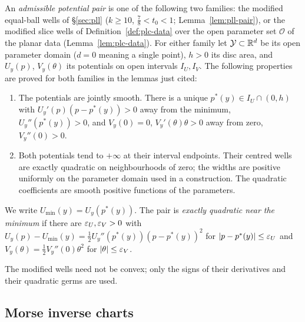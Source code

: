 \begin{definition}\label{def:pln-potential-pair}
An \emph{admissible potential pair} is one of the following two families: the modified equal-ball wells of
\S\ref{sec:pll} ($k\ge10$, $\frac78<t_0<1$; Lemma~\ref{lem:pll-pair}), or the modified slice wells of
Definition~\ref{def:plc-data} over the open parameter set $\mathcal O$ of the planar data (Lemma~\ref{lem:plc-data}).
For either family let $\mathcal Y\subset\mathbb{R}^d$ be its open parameter domain ($d=0$ meaning a single point), $h>0$ its
disc area, and $U_y(p)$, $V_y(\theta)$ its potentials on open intervals $I_U,I_V$. The following properties are proved
for both families in the lemmas just cited:
\begin{enumerate}[label=(P\arabic*)]
\item\label{it:pln-P1} The potentials are jointly smooth. There is a unique
$p^*(y)\in I_U\cap(0,h)$ with $U_y'(p)(p-p^*(y))>0$ away from the minimum,
$U_y''(p^*(y))>0$, and $V_y(0)=0$, $V_y'(\theta)\theta>0$ away from zero,
$V_y''(0)>0$.
\item\label{it:pln-P2} Both potentials tend to $+\infty$ at their interval
endpoints. Their centred wells are exactly quadratic on neighbourhoods of zero;
the widths are positive uniformly on the parameter domain used in a construction.
The quadratic coefficients are smooth positive functions of the parameters.
\end{enumerate}
We write $U_{\min}(y)=U_y(p^*(y))$. The pair is \emph{exactly quadratic near the minimum} if there are
$\varepsilon_U,\varepsilon_V>0$ with $U_y(p)-U_{\min}(y)=\frac12U_y''(p^*(y))(p-p^*(y))^2$ for $|p-p^*(y)|\le\varepsilon_U$ and
$V_y(\theta)=\frac12V_y''(0)\theta^2$ for $|\theta|\le\varepsilon_V$.
\end{definition}

The modified wells need not be convex; only the signs of their derivatives and their quadratic germs are used.

\subsection{Morse inverse charts}\label{sec:pln-morse}

